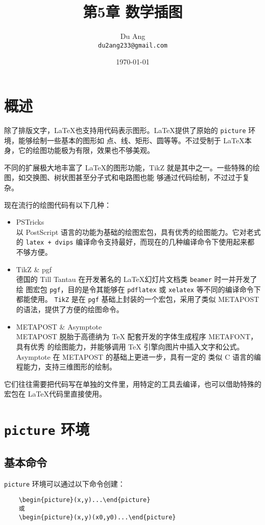 \documentclass[UTF8]{ctexart}
\title{\heiti 第5章 \quad 数学插图}
\author{\kaishu Du Ang \\ \texttt{du2ang233@gmail.com} }
\date{\today}
\begin{document}
\maketitle

\tableofcontents

\newpage

\section{概述}
除了排版文字，\LaTeX 也支持用代码表示图形。\LaTeX 提供了原始的 \texttt{picture} 环境，能够绘制一些基本的图形如
点、线、矩形、圆等等。不过受制于 \LaTeX 本身，它的绘图功能极为有限，效果也不够美观。

不同的扩展极大地丰富了 \LaTeX 的图形功能，TikZ 就是其中之一。一些特殊的绘图，如交换图、树状图甚至分子式和电路图也能
够通过代码绘制，不过过于复杂。

现在流行的绘图代码有以下几种：
\begin{itemize}
    \item PSTricks \\ 以 PostScript 语言的功能为基础的绘图宏包，具有优秀的绘图能力。它对老式的
    \texttt{latex + dvips} 编译命令支持最好，而现在的几种编译命令下使用起来都不够方便。
    \item TikZ \& pgf \\ 德国的 Till Tantau 在开发著名的 \LaTeX 幻灯片文档类 \texttt{beamer} 时一并开发了绘
    图宏包 \texttt{pgf}，目的是令其能够在 \texttt{pdflatex} 或 \texttt{xelatex} 等不同的编译命令下都能使用。
    \texttt{TikZ} 是在 \texttt{pgf} 基础上封装的一个宏包，采用了类似 METAPOST 的语法，提供了方便的绘图命令。
    \item METAPOST \& Asymptote \\ METAPOST 脱胎于高德纳为 \TeX{} 配套开发的字体生成程序 METAFONT，具有优秀
    的绘图能力，并能够调用 \TeX{} 引擎向图片中插入文字和公式。Asymptote 在 METAPOST 的基础上更进一步，具有一定的
    类似 C 语言的编程能力，支持三维图形的绘制。
\end{itemize}

它们往往需要把代码写在单独的文件里，用特定的工具去编译，也可以借助特殊的宏包在 \LaTeX 代码里直接使用。

\section{\texttt{picture} 环境}
\subsection{基本命令}
\texttt{picture} 环境可以通过以下命令创建：
\begin{verbatim}
    \begin{picture}(x,y)...\end{picture}
    或
    \begin{picture}(x,y)(x0,y0)...\end{picture}
\end{verbatim}
\end{document}
